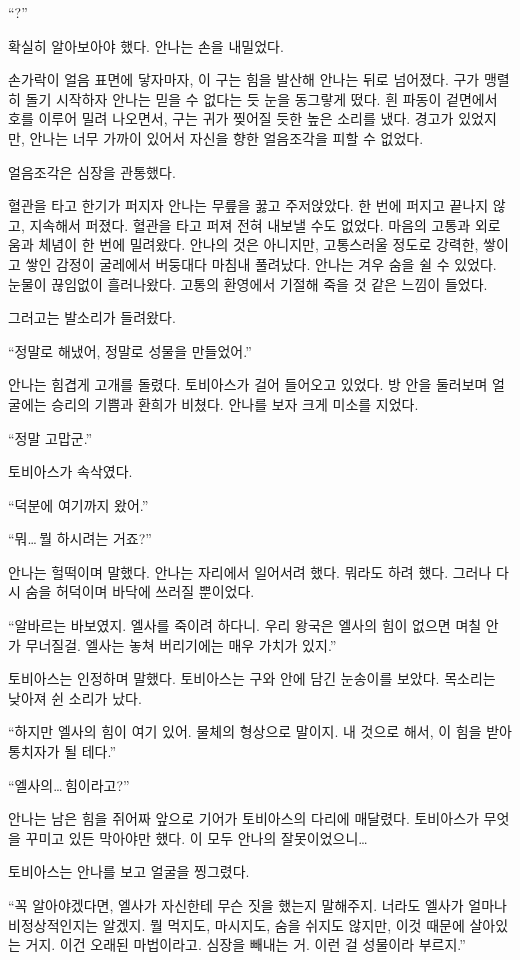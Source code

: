 ``?''

확실히 알아보아야 했다. 안나는 손을 내밀었다.

손가락이 얼음 표면에 닿자마자, 이 구는 힘을 발산해 안나는 뒤로 넘어졌다. 구가 맹렬히 돌기 시작하자 안나는 믿을 수 없다는 듯 눈을 동그랗게 떴다. 흰 파동이 겉면에서 호를 이루어 밀려 나오면서, 구는 귀가 찢어질 듯한 높은 소리를 냈다. 경고가 있었지만, 안나는 너무 가까이 있어서 자신을 향한 얼음조각을 피할 수 없었다.

얼음조각은 심장을 관통했다.

혈관을 타고 한기가 퍼지자 안나는 무릎을 꿇고 주저앉았다. 한 번에 퍼지고 끝나지 않고, 지속해서 퍼졌다. 혈관을 타고 퍼져 전혀 내보낼 수도 없었다. 마음의 고통과 외로움과 체념이 한 번에 밀려왔다. 안나의 것은 아니지만, 고통스러울 정도로 강력한, 쌓이고 쌓인 감정이 굴레에서 버둥대다 마침내 풀려났다. 안나는 겨우 숨을 쉴 수 있었다. 눈물이 끊임없이 흘러나왔다. 고통의 환영에서 기절해 죽을 것 같은 느낌이 들었다.

그러고는 발소리가 들려왔다.

``정말로 해냈어, 정말로 성물을 만들었어.''

안나는 힘겹게 고개를 돌렸다. 토비아스가 걸어 들어오고 있었다. 방 안을 둘러보며 얼굴에는 승리의 기쁨과 환희가 비쳤다. 안나를 보자 크게 미소를 지었다.

``정말 고맙군.''

토비아스가 속삭였다.

``덕분에 여기까지 왔어.''

``뭐\ldots\,뭘 하시려는 거죠?''

안나는 헐떡이며 말했다. 안나는 자리에서 일어서려 했다. 뭐라도 하려 했다. 그러나 다시 숨을 허덕이며 바닥에 쓰러질 뿐이었다.

``알바르는 바보였지. 엘사를 죽이려 하다니. 우리 왕국은 엘사의 힘이 없으면 며칠 안 가 무너질걸. 엘사는 놓쳐 버리기에는 매우 가치가 있지.''

토비아스는 인정하며 말했다. 토비아스는 구와 안에 담긴 눈송이를 보았다. 목소리는 낮아져 쉰 소리가 났다.

``하지만 엘사의 힘이 여기 있어. 물체의 형상으로 말이지. 내 것으로 해서, 이 힘을 받아 통치자가 될 테다.''

``엘사의\ldots\,힘이라고?''

안나는 남은 힘을 쥐어짜 앞으로 기어가 토비아스의 다리에 매달렸다. 토비아스가 무엇을 꾸미고 있든 막아야만 했다. 이 모두 안나의 잘못이었으니\ldots

토비아스는 안나를 보고 얼굴을 찡그렸다.

``꼭 알아야겠다면, 엘사가 자신한테 무슨 짓을 했는지 말해주지. 너라도 엘사가 얼마나 비정상적인지는 알겠지. 뭘 먹지도, 마시지도, 숨을 쉬지도 않지만, 이것 때문에 살아있는 거지. 이건 오래된 마법이라고. 심장을 빼내는 거. 이런 걸 성물이라 부르지.''

